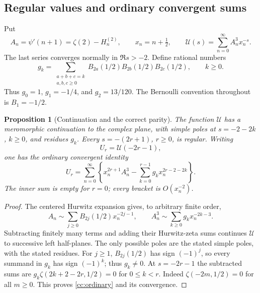 \documentclass[11pt,letterpaper]{article}
\newtheorem{proposition}[theorem]{Proposition}
\theoremstyle{definition}
\theoremstyle{remark}
\numberwithin{equation}{section}
\begin{document}
\subsection{Regular values and ordinary convergent sums}

Put
\begin{equation}\label{cc:definitions}
 A_n=\psi'(n+1)=\zeta(2)-H_n^{(2)},\qquad
 x_n=n+\tfrac12,\qquad
 \mathcal U(s)=\sum_{n=0}^{\infty}A_n^3x_n^{-s}.
\end{equation}
The last series converges normally in $\Re s>-2$.  Define rational
numbers
\begin{equation}\label{cc:g}
 g_k=\sum_{\substack{a+b+c=k\\a,b,c\ge0}}
 B_{2a}(1/2)B_{2b}(1/2)B_{2c}(1/2),\qquad k\ge0.
\end{equation}
Thus $g_0=1$, $g_1=-1/4$, and $g_2=13/120$.
The Bernoulli convention throughout is $B_1=-1/2$.

\begin{proposition}[Continuation and the correct parity]
\label{cc:continuation}
The function $\mathcal U$ has a meromorphic continuation to the complex
plane, with simple poles at $s=-2-2k$, $k\ge0$, and residues $g_k$.
Every $s=-(2r+1)$, $r\ge0$, is regular.  Writing
\begin{equation}\label{cc:Mr}
 U_r=\mathcal U(-2r-1),
\end{equation}
one has the ordinary convergent identity
\begin{equation}\label{cc:ordinary}
 U_r=\sum_{n=0}^{\infty}
 \left\{x_n^{2r+1}A_n^3-
       \sum_{k=0}^{r-1}g_kx_n^{2r-2-2k}\right\}.
\end{equation}
The inner sum is empty for $r=0$; every bracket is $O(x_n^{-2})$.
\end{proposition}

\begin{proof}
The centered Hurwitz expansion gives, to arbitrary finite order,
\[
 A_n\sim\sum_{j\ge0}B_{2j}(1/2)x_n^{-2j-1},\qquad
 A_n^3\sim\sum_{k\ge0}g_kx_n^{-2k-3}.
\]
Subtracting finitely many terms and adding their Hurwitz-zeta sums
continues $\mathcal U$ to successive left half-planes.  The only
possible poles are the stated simple poles, with the stated residues.
For $j\ge1$, $B_{2j}(1/2)$ has sign $(-1)^j$, so every summand
in $g_k$ has sign $(-1)^k$; thus $g_k\ne0$.
At $s=-2r-1$ the subtracted sums are
$g_k\zeta(2k+2-2r,1/2)=0$ for $0\le k<r$.
Indeed $\zeta(-2m,1/2)=0$ for all $m\ge0$.
This proves \eqref{cc:ordinary} and its convergence.
\end{proof}
\end{document}
